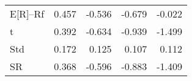 \begin{tabular}{lrrrr}
\toprule
\midrule
E[R]--Rf & 0.457 & -0.536 & -0.679 & -0.022 \\
t & 0.392 & -0.634 & -0.939 & -1.499 \\
Std & 0.172 & 0.125 & 0.107 & 0.112 \\
SR & 0.368 & -0.596 & -0.883 & -1.409 \\
\bottomrule
\end{tabular}
